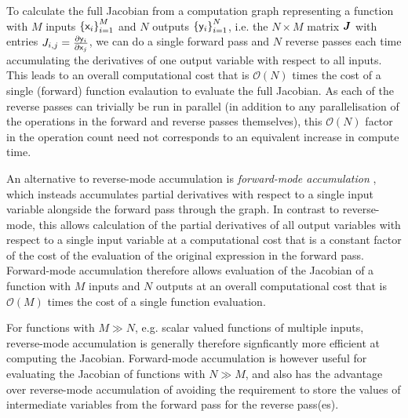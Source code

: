 To calculate the full Jacobian from a computation graph representing a function with $M$ inputs $\fset{\rvar{x}_i}_{i=1}^M$ and $N$ outputs $\fset{\rvar{y}_i}_{i=1}^N$, i.e. the $N \times M$ matrix $\boldsymbol{J}$ with entries $J_{i,j} = \frac{\partial \mathsf{y}_i}{\partial \mathsf{x}_j}$, we can do a single forward pass and $N$ reverse passes each time accumulating the derivatives of one output variable with respect to all inputs. This leads to an overall computational cost that is $\mathcal{O}(N)$ times the cost of a single (forward) function evalaution to evaluate the full Jacobian. As each of the reverse passes can trivially be run in parallel (in addition to any parallelisation of the operations in the forward and reverse passes themselves), this $\mathcal{O}(N)$ factor in the operation count need not corresponds to an equivalent increase in compute time.

An alternative to reverse-mode accumulation is \emph{forward-mode accumulation} \citep{wengert1964simple}, which insteads accumulates partial derivatives with respect to a single input variable alongside the forward pass through the graph. In contrast to reverse-mode, this allows calculation of the partial derivatives of all output variables with respect to a single input variable at a computational cost that is a constant factor of the cost of the evaluation of the original expression in the forward pass. Forward-mode accumulation therefore allows evaluation of the Jacobian of a function with $M$ inputs and $N$ outputs at an overall computational cost that is $\mathcal{O}(M)$ times the cost of a single function evaluation. 

For functions with $M \gg N$, e.g. scalar valued functions of multiple inputs, reverse-mode accumulation is generally therefore signficantly more efficient at computing the Jacobian. Forward-mode accumulation is however useful for evaluating the Jacobian of functions with $N \gg M$, and also has the advantage over reverse-mode accumulation of avoiding the requirement to store the values of intermediate variables from the forward pass for the reverse pass(es).


